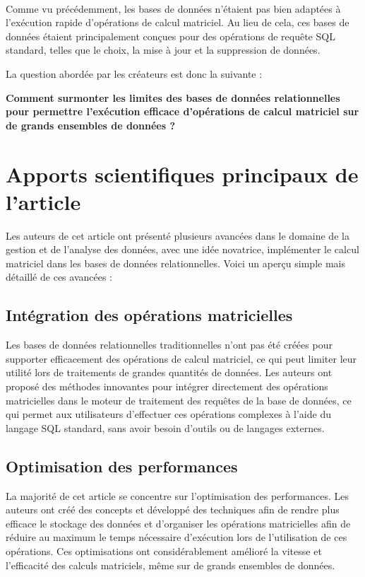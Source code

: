 \documentclass[a4paper, 12pt]{article}
\begin{document}
\paragraph{}
Comme vu précédemment, les bases de données n'étaient pas bien adaptées à l'exécution rapide d'opérations de calcul matriciel. Au lieu de cela, ces bases de données étaient principalement conçues pour des opérations de requête SQL standard, telles que le choix, la mise à jour et la suppression de données.
 
La question abordée par les créateurs est donc la suivante : 

\begin{center}
	\textbf{
		Comment surmonter les limites des bases de données relationnelles pour permettre l'exécution efficace d'opérations de calcul matriciel sur de grands ensembles de données ?
	}
\end{center}

\clearpage 
\section{Apports scientifiques principaux de l’article}

Les auteurs de cet article ont présenté plusieurs avancées dans le domaine de la gestion et de l'analyse des données, avec une idée novatrice, implémenter le calcul matriciel dans les bases de données relationnelles. Voici un aperçu simple mais détaillé de ces avancées :

\subsection{Intégration des opérations matricielles}
Les bases de données relationnelles traditionnelles n'ont pas été créées pour supporter efficacement des opérations de calcul matriciel, ce qui peut limiter leur utilité lors de traitements de grandes quantités de données. Les auteurs ont proposé des méthodes innovantes pour intégrer directement des opérations matricielles dans le moteur de traitement des requêtes de la base de données, ce qui permet aux utilisateurs d'effectuer ces opérations complexes à l'aide du langage SQL standard, sans avoir besoin d'outils ou de langages externes.

\subsection{Optimisation des performances}
La majorité de cet article se concentre sur l'optimisation des performances. Les auteurs ont créé des concepts et développé des techniques afin de rendre plus efficace le stockage des données et d'organiser les opérations matricielles afin de réduire au maximum le temps nécessaire d'exécution lors de l'utilisation de ces opérations. Ces optimisations ont considérablement amélioré la vitesse et l'efficacité des calculs matriciels, même sur de grands ensembles de données.
\end{document}
